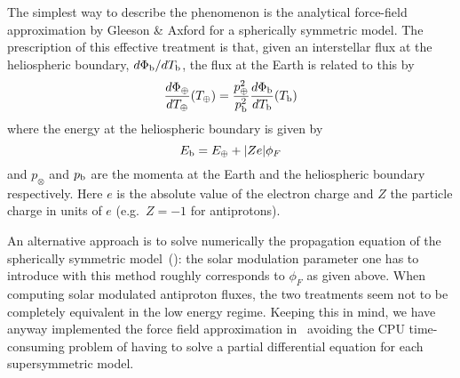 The simplest way to describe the phenomenon is the analytical force-field
approximation by Gleeson \& Axford \cite{GleesonAxford} for a spherically
symmetric model. The prescription of
this effective treatment is that, given an interstellar flux at the
heliospheric boundary, $d\Phi_{\rm b}/dT_{\rm b}$, the flux at the Earth
is related to this by
\begin{equation}
   \frac{d\Phi_{\oplus}}{dT_\oplus}(T_\oplus) = \frac{p_\oplus^2}{p_{\rm
   b}^2} \frac{d\Phi_{\rm b}}{dT_{\rm b}} (T_{\rm b})
\end{equation}
where the energy at the heliospheric boundary is given by
\begin{equation}
   E_{\rm b} = E_\oplus + |Ze|\phi_F
\end{equation}
and $p_{\otimes}$ and $p_{\rm b}$ are the momenta at the Earth and
the heliospheric boundary respectively.
Here $e$ is the absolute value of the electron charge and $Z$ the
particle charge in units of $e$ (e.g.\ $Z=-1$ for antiprotons).

An alternative approach is to solve numerically the propagation equation
of the spherically symmetric model~(\cite{fisk}): the solar modulation
parameter one has to introduce with this method roughly corresponds to
$\phi_F$ as given above. When computing solar modulated antiproton fluxes,
the two treatments seem not to be completely equivalent in the low energy
regime. Keeping this in mind, we have
anyway
implemented the force field approximation in \ds\, avoiding the
CPU time-consuming problem of
having to solve a partial differential equation for each
supersymmetric model.


